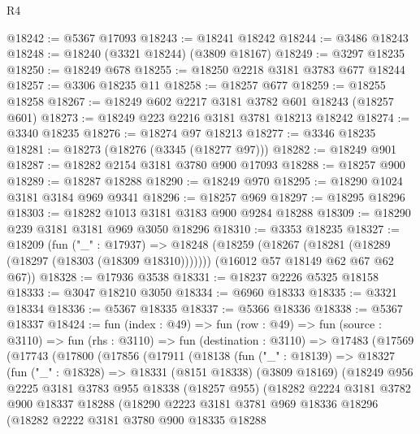 \begin{lexlean}{R4}
\begin{coremodule}
@18242 := @5367 @17093
@18243 := @18241 @18242
@18244 := @3486 @18243
@18248 := @18240 (@3321 @18244) (@3809 @18167)
@18249 := @3297 @18235
@18250 := @18249 @678
@18255 := @18250 @2218 @3181 @3783 @677 @18244
@18257 := @3306 @18235 @11
@18258 := @18257 @677
@18259 := @18255 @18258
@18267 := @18249 @602 @2217 @3181 @3782 @601 @18243 (@18257 @601)
@18273 := @18249 @223 @2216 @3181 @3781 @18213 @18242
@18274 := @3340 @18235
@18276 := @18274 @97 @18213
@18277 := @3346 @18235
@18281 := @18273 (@18276 (@3345 (@18277 @97)))
@18282 := @18249 @901
@18287 := @18282 @2154 @3181 @3780 @900 @17093
@18288 := @18257 @900
@18289 := @18287 @18288
@18290 := @18249 @970
@18295 := @18290 @1024 @3181 @3184 @969 @9341
@18296 := @18257 @969
@18297 := @18295 @18296
@18303 := @18282 @1013 @3181 @3183 @900 @9284 @18288
@18309 := @18290 @239 @3181 @3181 @969 @3050 @18296
@18310 := @3353 @18235
@18327 := @18209
    (fun ("_" : @17937) =>
    @18248
      (@18259 (@18267 (@18281 (@18289 (@18297 (@18303 (@18309 @18310)))))))
      (@16012 @57 @18149 @62 @67 @62 @67))
@18328 := @17936 @3538
@18331 := @18237 @2226 @5325 @18158
@18333 := @3047 @18210 @3050
@18334 := @6960 @18333
@18335 := @3321 @18334
@18336 := @5367 @18335
@18337 := @5366 @18336
@18338 := @5367 @18337
@18424 := fun (index : @49) =>
  fun (row : @49) =>
  fun (source : @3110) =>
  fun (rhs : @3110) =>
  fun (destination : @3110) =>
  @17483
    (@17569
      (@17743
        (@17800
          (@17856
            (@17911
              (@18138
                (fun ("_" : @18139) =>
                @18327
                  (fun ("_" : @18328) =>
                  @18331
                    (@8151 @18338)
                    (@3809 @18169)
                    (@18249
                      @956
                      @2225
                      @3181
                      @3783
                      @955
                      @18338
                      (@18257 @955)
                      (@18282
                        @2224
                        @3181
                        @3782
                        @900
                        @18337
                        @18288
                        (@18290
                          @2223
                          @3181
                          @3781
                          @969
                          @18336
                          @18296
                          (@18282
                            @2222
                            @3181
                            @3780
                            @900
                            @18335
                            @18288

\end{coremodule}
\end{lexlean}
